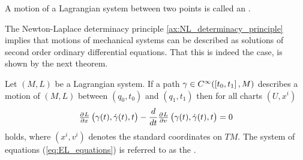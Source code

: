 \begin{definition}[Extremal]
	A motion of a Lagrangian system between two points is called an .
\end{definition}

The Newton-Laplace determinacy principle \ref{ax:NL_determinacy_principle} implies that motions of mechanical systems can be described as solutions of second order ordinary differential equations. That this is indeed the case, is shown by the next theorem.

\begin{theorem}
	\label{thm:EL_equations}
	Let $(M,L)$ be a Lagrangian system. If a path $\gamma \in C^\infty(\intcc[0]{t_0,t_1},M)$ describes a motion of $(M,L)$ between $(q_0,t_0)$ and $(q_1,t_1)$ then for all charts $(U,x^i)$
	\begin{equation}
		\label{eq:EL_equations}
		\pd{L}{x}\del[1]{\gamma(t),\dot{\gamma}(t),t} - \frac{d}{dt} \pd{L}{v}\del[1]{\gamma(t),\dot{\gamma}(t),t} = 0
	\end{equation}
	\noindent holds, where $(x^i,v^i)$ denotes the standard coordinates on $TM$. The system of equations \textup{(}\ref{eq:EL_equations}\textup{)} is referred to as the .
\end{theorem}

